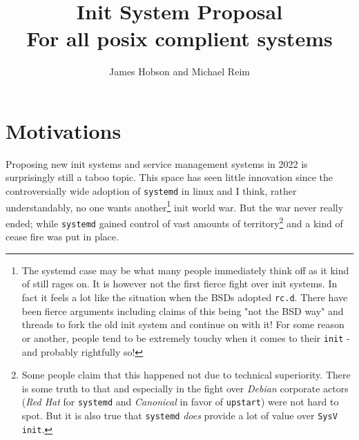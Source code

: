 \documentclass{article}
\title{Init System Proposal\\ \large{For all posix complient systems}}
\author{James Hobson and Michael Reim}
\begin{document}
\maketitle

\tableofcontents

\setlength{\parindent}{0em}
\setlength{\parskip}{1em}

\section{Motivations}
Proposing new init systems and service management systems in 2022 is surprisingly still a taboo topic. This space has seen little innovation since the controversially wide adoption of \texttt{systemd} in linux and I think, rather understandably, no one wants another\footnote{The systemd case may be what many people immediately think off as it kind of still rages on. It is however not the first fierce fight over init systems. In fact it feels a lot like the situation when the BSDs adopted \texttt{rc.d}. There have been fierce arguments including claims of this being "not the BSD way" and threads to fork the old init system and continue on with it! For some reason or another, people tend to be extremely touchy when it comes to their \texttt{init} - and probably rightfully so!} init world war. But the war never really ended; while \texttt{systemd} gained control of vast amounts of territory\footnote{Some people claim that this happened not due to technical superiority. There is some truth to that and especially in the fight over \textit{Debian} corporate actors (\textit{Red Hat} for \texttt{systemd} and \textit{Canonical} in favor of \texttt{upstart}) were not hard to spot. But it is also true that \texttt{systemd} \textit{does} provide a lot of value over \texttt{SysV init}.} and a kind of cease fire was put in place.
\end{document}
